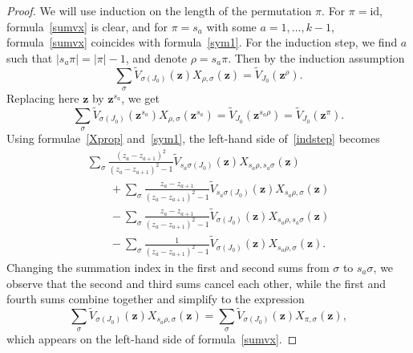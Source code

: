 \documentclass[pdftex]{sigma}
\numberwithin{equation}{section}
\newcommand{\id}{\mathrm{id}}
\begin{document}
\begin{proof}
We will use induction on the length of the permutation $\pi$. For $\pi=\id$, formula~\eqref{sumvx} is clear, and for $\pi=s_a$ with some $a=1,\dots,k-1$, formula~\eqref{sumvx} coincides with formula~\eqref{sym1}. For the induction step, we find $a$ such that $|s_a\pi|=|\pi|-1$, and denote $\rho =s_a\pi$. Then by the induction assumption
\begin{equation*}
\sum_{\sigma} \widetilde{V}_{\sigma(J_0)}(\boldsymbol{z})X_{\rho,\sigma}(\boldsymbol{z})= \widetilde{V}_{J_0}(\boldsymbol{z}^\rho).
\end{equation*}
Replacing here $\boldsymbol{z}$ by $\boldsymbol{z}^{s_a}$, we get
\begin{equation}\label{indstep}
\sum_{\sigma} \widetilde{V}_{\sigma(J_0)}(\boldsymbol{z}^{s_a})X_{\rho,\sigma}(\boldsymbol{z}^{s_a})= \widetilde{V}_{J_0}(\boldsymbol{z}^{s_a\rho})=\widetilde{V}_{J_0}(\boldsymbol{z}^{\pi}).
\end{equation}
Using formulae~\eqref{Xprop} and~\eqref{sym1}, the left-hand side of~\eqref{indstep} becomes
\begin{gather*}
\sum_{\sigma} \frac{(z_a-z_{a+1})^2}{(z_a-z_{a+1})^2-1}\widetilde{V}_{s_a\sigma(J_0)}(\boldsymbol{z})X_{s_a\rho,s_a\sigma}(\boldsymbol{z})\\
\qquad{} +\sum_{\sigma}\frac{z_a-z_{a+1}}{(z_a-z_{a+1})^2-1}\widetilde{V}_{s_a\sigma(J_0)}(\boldsymbol{z})X_{s_a\rho,\sigma}(\boldsymbol{z})\\
\qquad{}- \sum_{\sigma}\frac{z_a-z_{a+1}}{(z_a-z_{a+1})^2-1}\widetilde{V}_{\sigma(J_0)}(\boldsymbol{z})X_{s_a\rho,s_a\sigma}(\boldsymbol{z})\\
\qquad{} -\sum_{\sigma} \frac{1}{(z_a-z_{a+1})^2-1}\widetilde{V}_{\sigma(J_0)}(\boldsymbol{z})X_{s_a\rho, \sigma}(\boldsymbol{z}).
\end{gather*}
Changing the summation index in the first and second sums from $\sigma$ to $s_a\sigma$, we observe that the second and third sums cancel each other, while the first and fourth sums combine together and simplify to the expression
\begin{equation*}
\sum_{\sigma} \widetilde{V}_{\sigma(J_0)}(\boldsymbol{z})X_{s_a\rho,\sigma}(\boldsymbol{z}) =\sum_{\sigma} \widetilde{V}_{\sigma(J_0)}(\boldsymbol{z})X_{\pi,\sigma}(\boldsymbol{z}),
\end{equation*}
which appears on the left-hand side of formula~\eqref{sumvx}.
\end{proof}
\end{document}
